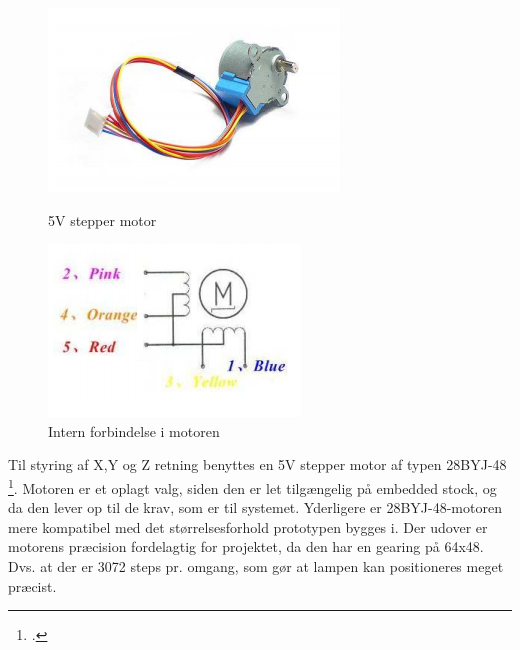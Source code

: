 \begin{figure}[H]
\centering
\begin{minipage}{.5\textwidth}
  \centering
  \includegraphics[width=\linewidth]{0_Filer/Figuer/5_HW_Design/Stepper_motor.png}
  \caption{5V stepper motor}
  \label{fig:HWD_Stepper_Motor}
\end{minipage}%
\begin{minipage}{.5\textwidth}
  \centering
  \includegraphics[width=\linewidth]{0_Filer/Figuer/5_HW_Design/Motor_diagram.png}
  \caption{Intern forbindelse i motoren}
  \label{fig:HWD_Stepper_Diagram}
\end{minipage}
\end{figure}

Til styring af X,Y og Z retning benyttes en 5V stepper motor af typen 28BYJ-48 \footcite{28BYJ-48-5V}. Motoren er et oplagt valg, siden den er let tilgængelig på embedded stock, og da den lever op til de krav, som er til systemet. Yderligere er 28BYJ-48-motoren mere kompatibel med det størrelsesforhold prototypen bygges i. Der udover er motorens præcision fordelagtig for projektet, da den har en gearing på 64x48. Dvs. at der er 3072 steps pr. omgang, som gør at lampen kan positioneres meget præcist.

